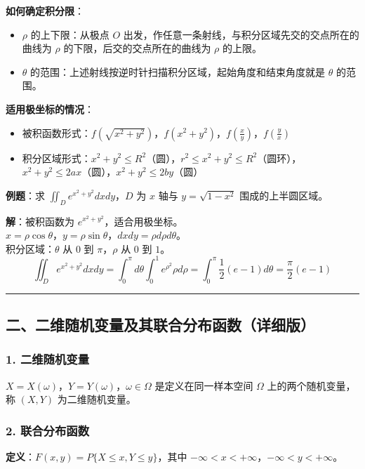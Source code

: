 \documentclass[12pt,a4paper]{ctexart}
\begin{document}
\textbf{如何确定积分限}：
\begin{itemize}[noitemsep]
    \item $\rho$ 的上下限：从极点 $O$ 出发，作任意一条射线，与积分区域先交的交点所在的曲线为 $\rho$ 的下限，后交的交点所在的曲线为 $\rho$ 的上限。
    \item $\theta$ 的范围：上述射线按逆时针扫描积分区域，起始角度和结束角度就是 $\theta$ 的范围。
\end{itemize}

\textbf{适用极坐标的情况}：
\begin{itemize}[noitemsep]
    \item 被积函数形式：$f(\sqrt{x^2+y^2})$，$f(x^2+y^2)$，$f(\frac{x}{y})$，$f(\frac{y}{x})$
    \item 积分区域形式：$x^2 + y^2 \le R^2$（圆），$r^2 \le x^2 + y^2 \le R^2$（圆环），$x^2 + y^2 \le 2ax$（圆），$x^2 + y^2 \le 2by$（圆）
\end{itemize}

\textbf{例题}：求 $\iint_D e^{x^2 + y^2} dxdy$，$D$ 为 $x$ 轴与 $y = \sqrt{1 - x^2}$ 围成的上半圆区域。

\textbf{解}：被积函数为 $e^{x^2+y^2}$，适合用极坐标。\\
$x = \rho \cos \theta$，$y = \rho \sin \theta$，$dxdy = \rho d\rho d\theta$。\\
积分区域：$\theta$ 从 $0$ 到 $\pi$，$\rho$ 从 $0$ 到 $1$。
\[ \iint_D e^{x^2+y^2} dxdy = \int_0^\pi d\theta \int_0^1 e^{\rho^2} \rho d\rho = \int_0^\pi \frac{1}{2}(e-1) d\theta = \frac{\pi}{2}(e-1) \]

\vspace{1em}\hrule\vspace{1em}

\subsection{二、二维随机变量及其联合分布函数（详细版）}

\subsubsection{1. 二维随机变量}
$X = X(\omega)$，$Y = Y(\omega)$，$\omega \in \Omega$ 是定义在同一样本空间 $\Omega$ 上的两个随机变量，称 $(X, Y)$ 为二维随机变量。

\subsubsection{2. 联合分布函数}
\textbf{定义}：$F(x, y) = P\{X \le x, Y \le y\}$，其中 $-\infty < x < +\infty$，$-\infty < y < +\infty$。
\end{document}
